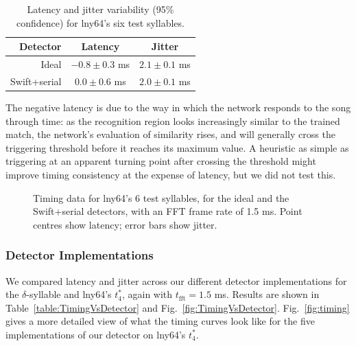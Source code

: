 \documentclass[10pt,letterpaper]{article}
\newcommand\fig[1]{Fig.~\ref{#1}}
\begin{document}
\begin{table}
  \begin{tabular}{r|cc}
    Detector & Latency & Jitter \\ 
    \hline   Ideal & $-0.8\pm 0.3$ ms & $2.1\pm 0.1$ ms \\
    Swift+serial & $0.0\pm 0.6$ ms & $2.0\pm 0.1$ ms
  \end{tabular}
  \caption{Latency and jitter variability (95\% confidence) for lny64's six test syllables.}
  \label{table:TimingVsSyllable}
\end{table}

The negative latency is due to the way in which the network responds
to the song through time: as the recognition region looks increasingly
similar to the trained match, the network's evaluation of similarity
rises, and will generally cross the triggering threshold before it
reaches its maximum value.  A heuristic as simple as triggering at an
apparent turning point after crossing the threshold might improve
timing consistency at the expense of latency, but we did not test this.

\begin{figure}
  \begin{center}
  \end{center}
  \caption{Timing data for lny64's 6 test syllables, for the ideal and the
    Swift+serial detectors, with an FFT frame rate of 1.5 ms.  Point
    centres show latency; error bars show jitter.}
  \label{fig:TimingVsSyllable}
\end{figure}


\subsubsection{Detector Implementations}

We compared latency and jitter across our different detector
implementations for the $\delta$-syllable and lny64's $t^*_4$, again with
$t_\mathrm{fft}=1.5$ ms.  Results are shown in Table~\ref{table:TimingVsDetector} and \fig{fig:TimingVsDetector}.
\fig{fig:timing} gives a more detailed view of what the timing curves
look like for the five implementations of our detector on lny64's $t^*_4$.
\end{document}
